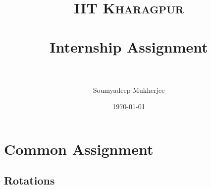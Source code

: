 \documentclass[paper=a4, fontsize=11pt]{scrartcl} %
\title{	
\normalfont \normalsize 
\textsc{IIT Kharagpur} \\ [25pt] %
\horrule{0.5pt} \\[0.4cm] %
\huge Internship Assignment \\ %
\horrule{2pt} \\[0.5cm] %
}
\author{Soumyadeep Mukherjee} %
\date{\normalsize\today} %
\numberwithin{equation}{section} %
\numberwithin{figure}{section} %
\numberwithin{table}{section} %
\begin{document}
\maketitle %


\section{Common Assignment}


\subsection{Rotations}
\end{document}
